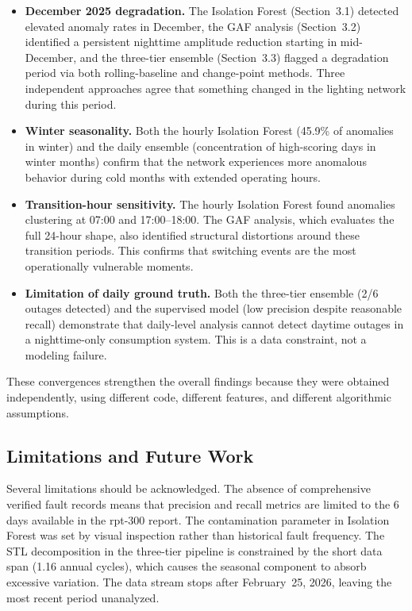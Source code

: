 \documentclass{article}
\begin{document}
\begin{itemize}
    \item \textbf{December 2025 degradation.} The Isolation Forest (Section~3.1) detected elevated anomaly rates in December, the GAF analysis (Section~3.2) identified a persistent nighttime amplitude reduction starting in mid-December, and the three-tier ensemble (Section~3.3) flagged a degradation period via both rolling-baseline and change-point methods. Three independent approaches agree that something changed in the lighting network during this period.

    \item \textbf{Winter seasonality.} Both the hourly Isolation Forest (45.9\% of anomalies in winter) and the daily ensemble (concentration of high-scoring days in winter months) confirm that the network experiences more anomalous behavior during cold months with extended operating hours.

    \item \textbf{Transition-hour sensitivity.} The hourly Isolation Forest found anomalies clustering at 07:00 and 17:00--18:00. The GAF analysis, which evaluates the full 24-hour shape, also identified structural distortions around these transition periods. This confirms that switching events are the most operationally vulnerable moments.

    \item \textbf{Limitation of daily ground truth.} Both the three-tier ensemble (2/6 outages detected) and the supervised model (low precision despite reasonable recall) demonstrate that daily-level analysis cannot detect daytime outages in a nighttime-only consumption system. This is a data constraint, not a modeling failure.
\end{itemize}

These convergences strengthen the overall findings because they were obtained independently, using different code, different features, and different algorithmic assumptions.


\subsection{Limitations and Future Work}

Several limitations should be acknowledged. The absence of comprehensive verified fault records means that precision and recall metrics are limited to the 6 days available in the rpt-300 report. The contamination parameter in Isolation Forest was set by visual inspection rather than historical fault frequency. The STL decomposition in the three-tier pipeline is constrained by the short data span (1.16 annual cycles), which causes the seasonal component to absorb excessive variation. The data stream stops after February~25, 2026, leaving the most recent period unanalyzed.
\end{document}
